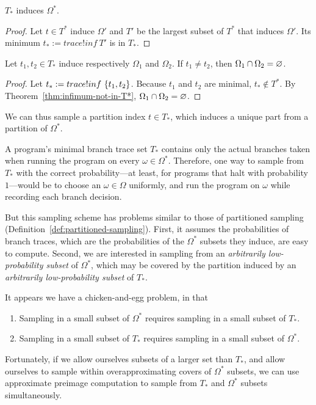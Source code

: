 \begin{theorem}
$T_*$ induces $\Omega^*$.
\end{theorem}
\begin{proof}
Let $t \in T^*$ induce $\Omega'$ and $T'$ be the largest subset of $T^*$ that induces $\Omega'$.
Its minimum $t_* := trace!inf~T'$ is in $T_*$.
\end{proof}

\begin{theorem}[$T_*$ partitions]
\label{thm:minimal-induces-partition}
Let $t_1,t_2 \in T_*$ induce respectively $\Omega_1$ and $\Omega_2$.
If $t_1 \neq t_2$, then $\Omega_1 \cap \Omega_2 = \varnothing$.
\end{theorem}
\begin{proof}
Let $t_* := trace!inf~\{{t_1,t_2}\}$.
Because $t_1$ and $t_2$ are minimal, $t_* \notin T^*$.
By Theorem~\ref{thm:infimum-not-in-T*}, $\Omega_1 \cap \Omega_2 = \varnothing$.
\end{proof}

We can thus sample a partition index $t \in T_*$, which induces a unique part from a partition of $\Omega^*$.

A program's minimal branch trace set $T_*$ contains only the actual branches taken when running the program on every $\omega \in \Omega^*$.
Therefore, one way to sample from $T_*$ with the correct probability---at least, for programs that halt with probability $1$---would be to choose an $\omega \in \Omega$ uniformly, and run the program on $\omega$ while recording each branch decision.

But this sampling scheme has problems similar to those of partitioned sampling (Definition~\ref{def:partitioned-sampling}).
First, it assumes the probabilities of branch traces, which are the probabilities of the $\Omega^*$ subsets they induce, are easy to compute.
Second, we are interested in sampling from an \emph{arbitrarily low-probability subset} of $\Omega^*$, which may be covered by the partition induced by an \emph{arbitrarily low-probability subset} of $T_*$.

It appears we have a chicken-and-egg problem, in that
\begin{enumerate}
	\item Sampling in a small subset of $\Omega^*$ requires sampling in a small subset of $T_*$.
	\item Sampling in a small subset of $T_*$ requires sampling in a small subset of $\Omega^*$.
\end{enumerate}
Fortunately, if we allow ourselves subsets of a larger set than $T_*$, and allow ourselves to sample within overapproximating covers of $\Omega^*$ subsets, we can use approximate preimage computation to sample from $T_*$ and $\Omega^*$ subsets simultaneously.

